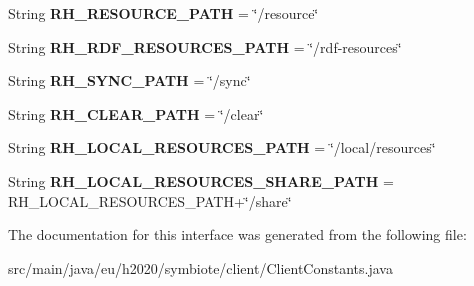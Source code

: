 \begin{DoxyCompactItemize}
\mbox{\label{interfaceeu_1_1h2020_1_1symbiote_1_1client_1_1ClientConstants_adec8ec33920b153c36271784297548da}} 
String {\bfseries R\+H\+\_\+\+R\+E\+S\+O\+U\+R\+C\+E\+\_\+\+P\+A\+TH} = \char`\"{}/resource\char`\"{}
\item 
\mbox{\label{interfaceeu_1_1h2020_1_1symbiote_1_1client_1_1ClientConstants_a19efa9fc52576df9a06307a8bc4b6784}} 
String {\bfseries R\+H\+\_\+\+R\+D\+F\+\_\+\+R\+E\+S\+O\+U\+R\+C\+E\+S\+\_\+\+P\+A\+TH} = \char`\"{}/rdf-\/resources\char`\"{}
\item 
\mbox{\label{interfaceeu_1_1h2020_1_1symbiote_1_1client_1_1ClientConstants_a7f839bdd84395ff1bfa25ac12740a2f9}} 
String {\bfseries R\+H\+\_\+\+S\+Y\+N\+C\+\_\+\+P\+A\+TH} = \char`\"{}/sync\char`\"{}
\item 
\mbox{\label{interfaceeu_1_1h2020_1_1symbiote_1_1client_1_1ClientConstants_a1efba20ae5e3d3197fe8d6b28322d25b}} 
String {\bfseries R\+H\+\_\+\+C\+L\+E\+A\+R\+\_\+\+P\+A\+TH} = \char`\"{}/clear\char`\"{}
\item 
\mbox{\label{interfaceeu_1_1h2020_1_1symbiote_1_1client_1_1ClientConstants_a4d5946b4b1940cfcf022a255349aa241}} 
String {\bfseries R\+H\+\_\+\+L\+O\+C\+A\+L\+\_\+\+R\+E\+S\+O\+U\+R\+C\+E\+S\+\_\+\+P\+A\+TH} = \char`\"{}/local/resources\char`\"{}
\item 
\mbox{\label{interfaceeu_1_1h2020_1_1symbiote_1_1client_1_1ClientConstants_a57374eddf9a15570942f69574e33e7ad}} 
String {\bfseries R\+H\+\_\+\+L\+O\+C\+A\+L\+\_\+\+R\+E\+S\+O\+U\+R\+C\+E\+S\+\_\+\+S\+H\+A\+R\+E\+\_\+\+P\+A\+TH} = R\+H\+\_\+\+L\+O\+C\+A\+L\+\_\+\+R\+E\+S\+O\+U\+R\+C\+E\+S\+\_\+\+P\+A\+TH+\char`\"{}/share\char`\"{}
\end{DoxyCompactItemize}


The documentation for this interface was generated from the following file\+:\begin{DoxyCompactItemize}
\item 
src/main/java/eu/h2020/symbiote/client/Client\+Constants.\+java\end{DoxyCompactItemize}
